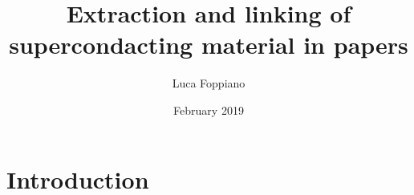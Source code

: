 \documentclass{article}
\title{Extraction and linking of supercondacting material in papers}
\author{Luca Foppiano}
\date{February 2019}
\begin{document}
\maketitle

\section{Introduction}
\end{document}
